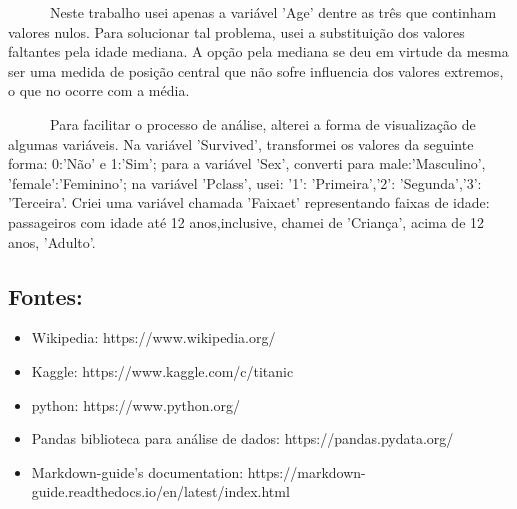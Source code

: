 \documentclass[11pt]{article}
\providecommand{\tightlist}{%
      \setlength{\itemsep}{0pt}\setlength{\parskip}{0pt}}
\begin{document}
   Neste trabalho usei apenas a variável 'Age' dentre as três que
continham valores nulos. Para solucionar tal problema, usei a
substituição dos valores faltantes pela idade mediana. A opção pela
mediana se deu em virtude da mesma ser uma medida de posição central que
não sofre influencia dos valores extremos, o que no ocorre com a média.

   Para facilitar o processo de análise, alterei a forma de visualização
de algumas variáveis. Na variável 'Survived', transformei os valores da
seguinte forma: 0:'Não' e 1:'Sim'; para a variável 'Sex', converti para
male:'Masculino', 'female':'Feminino'; na variável 'Pclass', usei: '1':
'Primeira','2': 'Segunda','3': 'Terceira'. Criei uma variável chamada
'Faixaet' representando faixas de idade: passageiros com idade até 12
anos,inclusive, chamei de 'Criança', acima de 12 anos, 'Adulto'.

    \subsection{Fontes:}\label{fontes}

    \begin{itemize}
\tightlist
\item
  Wikipedia: https://www.wikipedia.org/
\item
  Kaggle: https://www.kaggle.com/c/titanic
\item
  python: https://www.python.org/
\item
  Pandas biblioteca para análise de dados: https://pandas.pydata.org/
\item
  Markdown-guide's documentation:
  https://markdown-guide.readthedocs.io/en/latest/index.html
\end{itemize}


    
    
    
    
\end{document}
